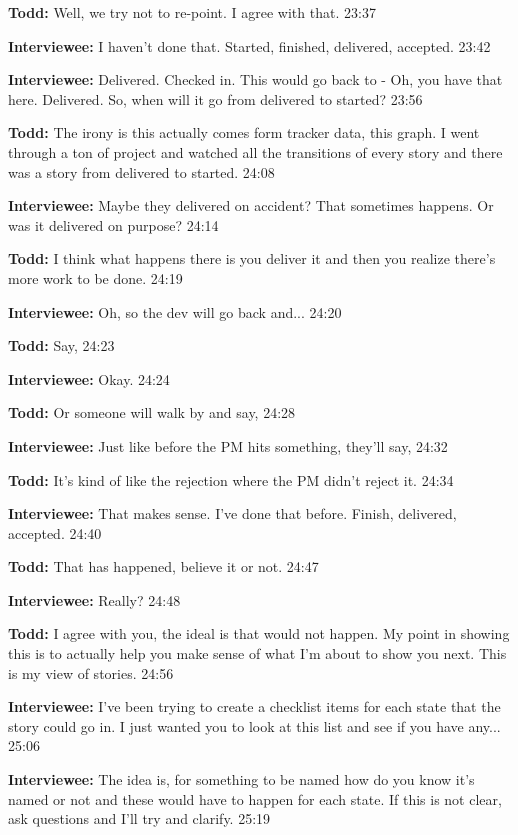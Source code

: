 \textbf{Todd:} Well, we try not to re-point. I agree with that. 23:37

\textbf{Interviewee:} I haven't done that. Started, finished, delivered, accepted. 23:42

\textbf{Interviewee:} Delivered. Checked in. This would go back to - Oh, you have that here. Delivered. So, when will it go from delivered to started?  23:56

\textbf{Todd:} The irony is this actually comes form tracker data, this graph. I went through a ton of project and watched all the transitions of every story and there was a story from delivered to started. 24:08

\textbf{Interviewee:} Maybe they delivered on accident? That sometimes happens. Or was it delivered on purpose? 24:14

\textbf{Todd:} I think what happens there is you deliver it and then you realize there's more work to be done. 24:19

\textbf{Interviewee:} Oh, so the dev will go back and... 24:20

\textbf{Todd:} Say,  24:23

\textbf{Interviewee:} Okay. 24:24

\textbf{Todd:} Or someone will walk by and say,  24:28

\textbf{Interviewee:} Just like  before the PM hits something, they'll say,  24:32

\textbf{Todd:} It's kind of like the rejection where the PM didn't reject it. 24:34

\textbf{Interviewee:} That makes sense. I've done that before. Finish, delivered, accepted. 24:40

\textbf{Todd:} That has happened, believe it or not. 24:47

\textbf{Interviewee:} Really? 24:48

\textbf{Todd:} I agree with you, the ideal is that would not happen. My point in showing this is to actually help you make sense of what I'm about to show you next. This is my view of stories. 24:56

\textbf{Interviewee:} I've been trying to create a checklist items for each state that the story could go in. I just wanted you to look at this list and see if you have any... 25:06

\textbf{Interviewee:} The idea is, for something to be named how do you know it's named or not and these would have to happen for each state. If this is not clear, ask questions and I'll try and clarify. 25:19

